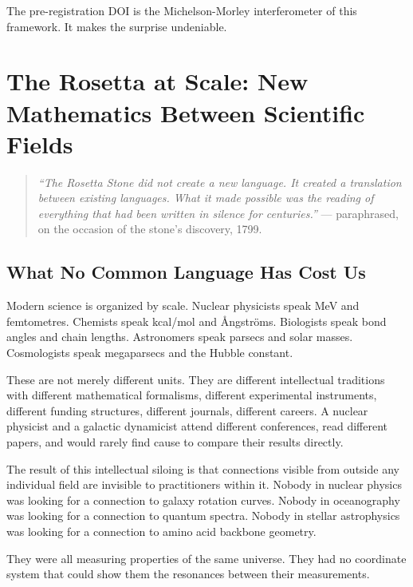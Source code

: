 \documentclass[11pt, letterpaper, openany]{book}
\begin{document}
The pre-registration DOI is the Michelson-Morley interferometer of this framework.
It makes the surprise undeniable.

\chapter{The Rosetta at Scale: New Mathematics Between Scientific Fields}

\begin{quote}
\textit{``The Rosetta Stone did not create a new language. It created a
translation between existing languages. What it made possible was the
reading of everything that had been written in silence for centuries.''}
--- paraphrased, on the occasion of the stone's discovery, 1799.
\end{quote}

\section{What No Common Language Has Cost Us}

Modern science is organized by scale. Nuclear physicists speak MeV and femtometres.
Chemists speak kcal/mol and Ångströms. Biologists speak bond angles and chain
lengths. Astronomers speak parsecs and solar masses. Cosmologists speak megaparsecs
and the Hubble constant.

These are not merely different units. They are different intellectual traditions
with different mathematical formalisms, different experimental instruments, different
funding structures, different journals, different careers. A nuclear physicist
and a galactic dynamicist attend different conferences, read different papers, and
would rarely find cause to compare their results directly.

The result of this intellectual siloing is that connections visible from outside
any individual field are invisible to practitioners within it. Nobody in nuclear
physics was looking for a connection to galaxy rotation curves. Nobody in
oceanography was looking for a connection to quantum spectra. Nobody in stellar
astrophysics was looking for a connection to amino acid backbone geometry.

They were all measuring properties of the same universe. They had no coordinate
system that could show them the resonances between their measurements.
\end{document}
